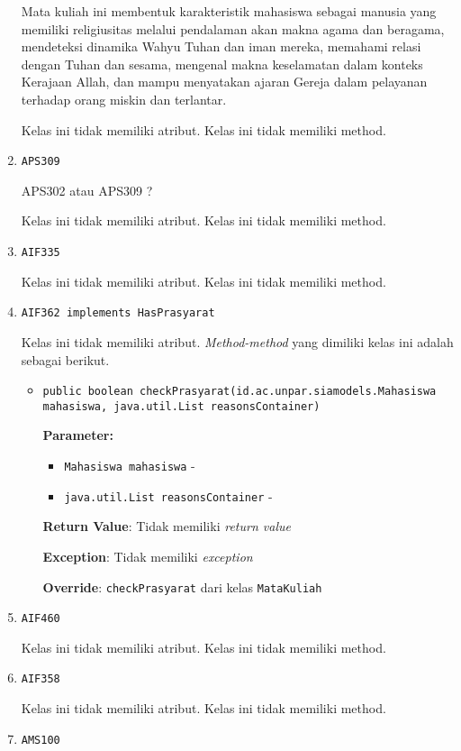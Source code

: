 \documentclass{article}
\begin{document}
\begin{enumerate}
Mata kuliah ini membentuk karakteristik mahasiswa sebagai manusia yang memiliki religiusitas
 melalui pendalaman akan makna agama dan beragama, mendeteksi dinamika Wahyu Tuhan dan iman 
 mereka, memahami relasi dengan Tuhan dan sesama, mengenal makna keselamatan dalam konteks 
 Kerajaan Allah, dan mampu menyatakan ajaran Gereja dalam pelayanan terhadap orang miskin dan
 terlantar.

Kelas ini tidak memiliki atribut. Kelas ini tidak memiliki method. \item \texttt{APS309}

APS302 atau APS309 ?

Kelas ini tidak memiliki atribut. Kelas ini tidak memiliki method. \item \texttt{AIF335}



Kelas ini tidak memiliki atribut. Kelas ini tidak memiliki method. \item \texttt{AIF362 implements HasPrasyarat}



Kelas ini tidak memiliki atribut. \textit{Method-method} yang dimiliki kelas ini adalah sebagai berikut.
\begin{itemize}
\item \texttt{public boolean checkPrasyarat(id.ac.unpar.siamodels.Mahasiswa mahasiswa, java.util.List reasonsContainer)}

\textbf{Parameter:}
\begin{itemize}
\item \texttt{Mahasiswa mahasiswa} - 
\item \texttt{java.util.List reasonsContainer} - 
\end{itemize}
\textbf{Return Value}: Tidak memiliki \textit{return value}

\textbf{Exception}: Tidak memiliki \textit{exception}

\textbf{Override}: \texttt{checkPrasyarat} dari kelas \texttt{MataKuliah}

\end{itemize}
\item \texttt{AIF460}



Kelas ini tidak memiliki atribut. Kelas ini tidak memiliki method. \item \texttt{AIF358}



Kelas ini tidak memiliki atribut. Kelas ini tidak memiliki method. \item \texttt{AMS100}


\end{enumerate}
\end{document}
